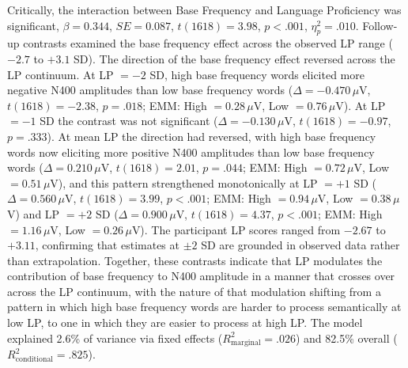 \documentclass[utf8]{FrontiersinHarvard} %
\begin{document}
	Critically, the interaction between Base Frequency and Language  Proficiency was significant, $\beta = 0.344$, $SE = 0.087$, $t(1618)  = 3.98$, $p < .001$, $\eta^2_p = .010$. Follow-up contrasts examined  the base frequency effect across the observed LP range ($-2.7$ to  $+3.1$ SD). The direction of the base frequency effect reversed across  the LP continuum. At LP $= -2$ SD, high base frequency words elicited  more negative N400 amplitudes than low base frequency words ($\Delta =  -0.470\,\mu$V, $t(1618) = -2.38$, $p = .018$; EMM: High $=  0.28\,\mu$V, Low $= 0.76\,\mu$V). At LP $= -1$ SD the contrast was  not significant ($\Delta = -0.130\,\mu$V, $t(1618) = -0.97$, $p =  .333$). At mean LP the direction had reversed, with high base frequency  words now eliciting more positive N400 amplitudes than low base  frequency words ($\Delta = 0.210\,\mu$V, $t(1618) = 2.01$, $p =  .044$; EMM: High $= 0.72\,\mu$V, Low $= 0.51\,\mu$V), and this  pattern strengthened monotonically at LP $= +1$ SD ($\Delta =  0.560\,\mu$V, $t(1618) = 3.99$, $p < .001$; EMM: High $= 0.94\,\mu$V,  Low $= 0.38\,\mu$V) and LP $= +2$ SD ($\Delta = 0.900\,\mu$V,  $t(1618) = 4.37$, $p < .001$; EMM: High $= 1.16\,\mu$V, Low $=  0.26\,\mu$V). The participant LP scores ranged from $-2.67$ to $+3.11$,  confirming that estimates at $\pm 2$ SD are grounded in observed data  rather than extrapolation. Together, these contrasts indicate that LP  modulates the contribution of base frequency to N400 amplitude in a  manner that crosses over across the LP continuum, with the nature of  that modulation shifting from a pattern in which high base frequency  words are harder to process semantically at low LP, to one in which  they are easier to process at high LP. The model explained 2.6\% of  variance via fixed effects ($R^2_{\mathrm{marginal}} = .026$) and  82.5\% overall ($R^2_{\mathrm{conditional}} = .825$).
	
\end{document}
